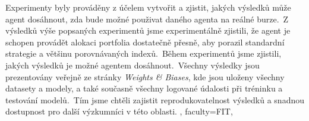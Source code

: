 {{        Experimenty byly prováděny z účelem vytvořit a zjistit, jakých výsledků může agent dosáhnout, zda bude možné použivat daného agenta na reálné burze.\ Z výsledků výše popsaných experimentů jsme experimentálně zjistili, že agent je schopen provádět alokaci portfolia dostatečně přesně, aby porazil standardní strategie a většinu porovnávaných indexů.\ Během experimentů jsme zjistili, jakých výsledků je možné agentem dosáhnout.\ Všechny výsledky jsou prezentovány veřejně ze stránky \emph{Weights \& Biases}, kde jsou uloženy všechny datasety a modely, a také současně všechny logované údalosti při tréninku a testování modelů.\ Tím jsme chtěli zajistit reprodukovatelnost výsledků a snadnou dostupnost pro další výzkumníci v této oblasti.
    },
%
    faculty={FIT}, %
}
